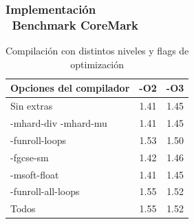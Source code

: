 \documentclass[xcolor=dvipsnames,mathserif,9pt]{beamer}
\begin{document}
\begin{frame} \frametitle{Implementación\\ \ Benchmark CoreMark}

\begin{table}[!h]
\begin{center}
\begin{tabular}{ |l |c |c| }
\hline
\rowcolor[gray]{0.8} Opciones del compilador&-O2&-O3 \\
\hline
Sin extras 					& 1.41 	 			& 1.45 \\
\hline
-mhard-div -mhard-mu 	& 1.41				& 1.45 \\
\hline
-funroll-loops			 	& 1.53				& 1.50 \\
\hline
-fgcse-sm					& 1.42				& 1.46\\
\hline
-msoft-float 				& 1.41				& 1.45 \\
\hline
-funroll-all-loops	 		& 1.55				& 1.52 \\
\hline
Todos	 					& 1.55				& 1.52 \\
\hline
\end{tabular}
\end{center}
\caption{Compilación con distintos niveles y flags de optimización}
\end{table}
\end{frame}
\end{document}
